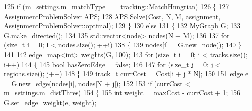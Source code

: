 \begin{DoxyCode}
125         \textcolor{keywordflow}{if} (\mbox{\hyperlink{class_c_tracker_acb84aee0d550f4cdadbfac6735811050}{m\_settings}}.\mbox{\hyperlink{struct_tracker_settings_a94a05cbda5eeeac7fa1b64baf9c703f5}{m\_matchType}} == 
      \mbox{\hyperlink{namespacetracking_a491e50c9261ab820965d871a217d4f13a8c97315e46df8c0716a9538655fc967d}{tracking::MatchHungrian}})
126         \{
127             \mbox{\hyperlink{class_assignment_problem_solver}{AssignmentProblemSolver}} APS;
128             APS.\mbox{\hyperlink{class_assignment_problem_solver_a38198467ca647403c40be2c2bb47e177}{Solve}}(Cost, N, M, assignment, 
      \mbox{\hyperlink{class_assignment_problem_solver_aec407eb73fed9d3ddb9467fde90a85e8a84f2334f61866dba64befa6910848d75}{AssignmentProblemSolver::optimal}});
129         \}
130         \textcolor{keywordflow}{else}
131         \{
132             \mbox{\hyperlink{class_my_graph}{MyGraph}} G;
133             G.\mbox{\hyperlink{classgraph_a1615678dee6248d6d8a00c553770b3bd}{make\_directed}}();
134 
135             std::vector<node> nodes(N + M);
136 
137             \textcolor{keywordflow}{for} (\textcolor{keywordtype}{size\_t} i = 0; i < nodes.size(); ++i)
138             \{
139                 nodes[i] = G.\mbox{\hyperlink{classgraph_ab9505335c20558319b6cce25aed23524}{new\_node}}();
140             \}
141 
142             \mbox{\hyperlink{classedge__map}{edge\_map<int>}} weights(G, 100);
143             \textcolor{keywordflow}{for} (\textcolor{keywordtype}{size\_t} i = 0; i < \mbox{\hyperlink{class_c_tracker_a86d322bc042985711c8d5ec8b9614230}{tracks}}.size(); i++)
144             \{
145                 \textcolor{keywordtype}{bool} hasZeroEdge = \textcolor{keyword}{false};
146 
147                 \textcolor{keywordflow}{for} (\textcolor{keywordtype}{size\_t} j = 0; j < regions.size(); j++)
148                 \{
149                     \mbox{\hyperlink{defines_8h_a7ce9c8817b42ab418e61756f579549ab}{track\_t}} currCost = Cost[i + j * N];
150 
151                     \mbox{\hyperlink{classedge}{edge}} e = G.\mbox{\hyperlink{classgraph_a02a0c3a219f75d68caa408ef339d4a1c}{new\_edge}}(nodes[i], nodes[N + j]);
152 
153                     \textcolor{keywordflow}{if} (currCost < \mbox{\hyperlink{class_c_tracker_acb84aee0d550f4cdadbfac6735811050}{m\_settings}}.\mbox{\hyperlink{struct_tracker_settings_a10e76ae03bd840f6c9180ce67faaa83c}{m\_distThres}})
154                     \{
155                         \textcolor{keywordtype}{int} weight = maxCost - currCost + 1;
156                         G.\mbox{\hyperlink{class_my_graph_a798846d9c09d7d5b49db3c75fb1f7f38}{set\_edge\_weight}}(e, weight);

\end{DoxyCode}
